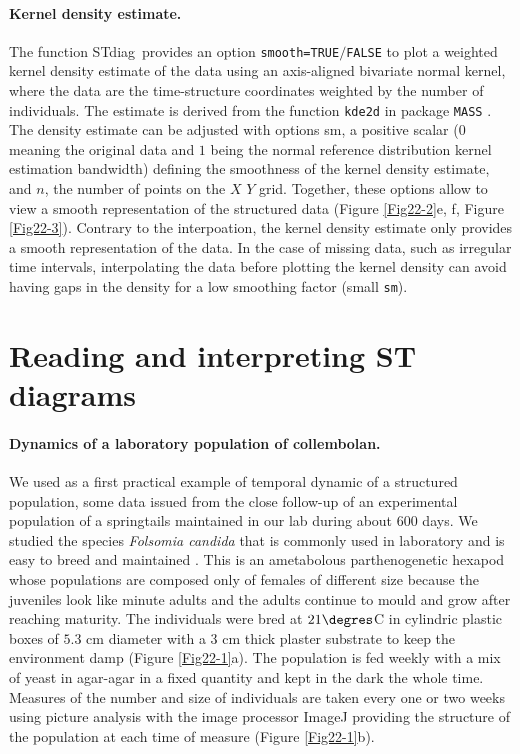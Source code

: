 \paragraph{Kernel density estimate.}
The function STdiag~provides an option \texttt{smooth=TRUE}$/$\texttt{FALSE} to
plot a weighted kernel density estimate of the data using an axis-aligned bivariate normal
kernel, where the data are the time-structure coordinates weighted by the number
of individuals. The estimate is derived from the function \texttt{kde2d} in
package \texttt{MASS} \autocite{venables2002a}. The density estimate can be
adjusted with options sm, a positive scalar ($0$ meaning the original data and $1$ being
the normal reference distribution kernel estimation bandwidth) defining the smoothness of
the kernel density estimate, and $n$, the number of points on the $X$ $Y$ grid.
Together, these options allow to view a smooth representation of the structured
data (Figure \ref{Fig22-2}e, f, Figure \ref{Fig22-3}). Contrary to the interpoation, the kernel density
estimate only provides a smooth representation of the data. In the case of
missing data, such as irregular time intervals, interpolating the data before
plotting the kernel density can avoid having gaps in the density for a low
smoothing factor (small \texttt{sm}).

\section{Reading and interpreting ST diagrams}

\paragraph{Dynamics of a laboratory population of collembolan.}
We used as a first practical example of temporal dynamic of a structured
population, some data issued from the close follow-up of an experimental
population of a springtails maintained in our lab during about $600$ days. We
studied the species \textit{Folsomia candida} that is commonly used in laboratory and is
easy to breed and maintained \autocite{fountain2005a}. This is
an ametabolous parthenogenetic hexapod whose populations are composed only of females of
different size because the juveniles look like minute adults and the adults
continue to mould and grow after reaching maturity. The individuals were bred at
$21 \degres$C in cylindric plastic boxes of $5.3$ cm diameter with a $3$ cm thick
plaster substrate to keep the environment damp \autocite{tully2008a} (Figure
\ref{Fig22-1}a). The population is fed weekly with a mix of yeast in agar-agar in a fixed quantity
and kept in the dark the whole time. Measures of the number and size of
individuals are taken every one or two weeks using picture analysis with the
image processor ImageJ \autocite{abramoff2004a,mallard2012a,mallard2013a}
providing the structure of the population at each time of measure (Figure \ref{Fig22-1}b).

